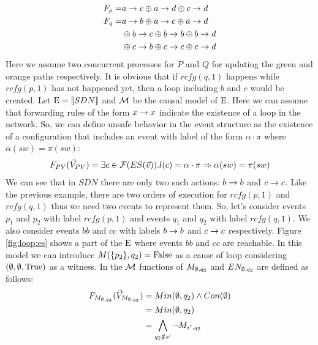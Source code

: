 \begin{example}
\begin{equation*}
\begin{aligned}
            F_p  = & a\rightarrow c \oplus a\rightarrow d \oplus c\rightarrow d               \\
            F_q  = & a\rightarrow b \oplus a\rightarrow c \oplus a\rightarrow d               \\
                   & \oplus b\rightarrow c \oplus b\rightarrow b \oplus b\rightarrow d        \\
                   & \oplus        c\rightarrow b \oplus c\rightarrow c \oplus c\rightarrow d
        \end{aligned}
    \end{equation*}
    Here we assume two concurrent processes for $P$ and $Q$ for 
    updating the green and orange paths respectively.
    It is obvious that if $rcfg(q,1)$ happens while $rcfg(p,1)$ 
    has not happened yet, then a loop including $b$ and $c$ 
    would be created.
    Let $\mathrm{E} = \llbracket SDN \rrbracket$ and $\mathcal{M}$ be the causal model 
    of $\mathrm{E}$.
    Here we can assume that forwarding rules of the form $x \rightarrow x$
    indicate the existence of a loop in the network.
    So, we can define unsafe behavior in the event structure
    as the existence of a configuration that includes an event with 
    label of the form $\alpha\cdot\pi$ where $\alpha(sw) = \pi(sw)$:
    \begin{align*}
        F_{PV}(\vec V_{PV}) = \exists c \in \mathcal{F}(ES(\vec v)).
        l(c) = \alpha\cdot\pi \Rightarrow \alpha(sw) = \pi(sw)
    \end{align*}
    We can see that in $SDN$ there are only two such actions:
    $b\rightarrow b$ and $c\rightarrow c$.
    Like the previous example, there are two orders of execution for
    $rcfg(p,1)$ and $rcfg(q,1)$ thus we need two events to represent
    them.
    So, let's consider events $p_1$ and $p_2$ with label $rcfg(p,1)$
    and events $q_1$ and $q_2$ with label $rcfg(q,1)$.
    We also consider events $bb$ and $cc$ with labels
    $b \rightarrow b$ and $c\rightarrow c$ respectively.
    Figure \ref{fig:loop:es} shows a part of the $\mathrm{E}$ where
    events $bb$ and $cc$ are reachable.
    In this model we can introduce $M(\{p_2\},q_2) = \mathrm{False}$ as a cause
    of loop considering $(\emptyset,\emptyset,\mathrm{True})$ as a witness.
    In the $\mathcal{M}$ functions of $M_{\emptyset,q_2}$ and $EN_{\emptyset,q_2}$ are
    defined as follows:
    \begin{align*}
        \f{M_{\e,q_2}}  & = Min(\e,q_2) \wedge Con(\e) \\
                        & = Min(\e,q_2)                \\
                        & =  \bigwedge_{q_2 \notin s'}
        \neg M_{s',q_2}                                \\

\end{align*}
\end{example}

